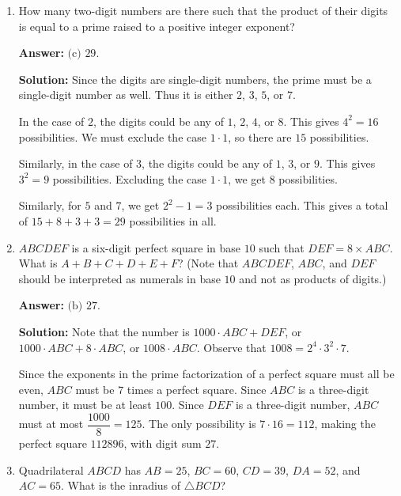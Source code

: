 \documentclass[11pt,paper=letter]{scrartcl}
\begin{document}
\begin{enumerate}[left=0pt]

\item How many two-digit numbers are there such that the product of their digits is equal to a prime raised to a positive integer exponent?


\textbf{Answer:} $\boxed{\text{(c) }29}$.

\textbf{Solution:} Since the digits are single-digit numbers, the prime must be a single-digit number as well. Thus it is either $2$, $3$, $5$, or $7$.

In the case of $2$, the digits could be any of $1$, $2$, $4$, or $8$. This gives $4^2 = 16$ possibilities. We must exclude the case $1 \cdot 1$, so there are $15$ possibilities.

Similarly, in the case of $3$, the digits could be any of $1$, $3$, or $9$. This gives $3^2 = 9$ possibilities. Excluding the case $1 \cdot 1$, we get $8$ possibilities.

Similarly, for $5$ and $7$, we get $2^2 - 1 = 3$ possibilities each. This gives a total of $15 + 8 + 3 + 3 = 29$ possibilities in all.

\item $ABCDEF$ is a six-digit perfect square in base $10$ such that $DEF = 8 \times ABC$. What is $A + B + C+ D + E + F$? (Note that $ABCDEF$, $ABC$, and $DEF$ should be interpreted as numerals in base $10$ and not as products of digits.)


\textbf{Answer:} $\boxed{\text{(b) }27}$.

\textbf{Solution:} Note that the number is $1000 \cdot ABC + DEF$, or $1000 \cdot ABC + 8 \cdot ABC$, or $1008 \cdot ABC$. Observe that $1008 = 2^4 \cdot 3^2 \cdot 7$.

Since the exponents in the prime factorization of a perfect square must all be even, $ABC$ must be $7$ times a perfect square. Since $ABC$ is a three-digit number, it must be at least $100$. Since $DEF$ is a three-digit number, $ABC$ must at most $\dfrac{1000}{8} = 125$. The only possibility is $7 \cdot 16 = 112$, making the perfect square $112896$, with digit sum $27$.

\item Quadrilateral $ABCD$ has $AB = 25$, $BC = 60$, $CD = 39$, $DA = 52$, and $AC = 65$. What is the inradius of $\triangle BCD$?



\end{enumerate}
\end{document}
